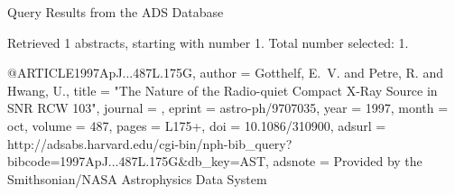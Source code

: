 Query Results from the ADS Database


Retrieved 1 abstracts, starting with number 1.  Total number selected: 1.

@ARTICLE{1997ApJ...487L.175G,
   author = {{Gotthelf}, E.~V. and {Petre}, R. and {Hwang}, U.},
    title = "{The Nature of the Radio-quiet Compact X-Ray Source in SNR RCW 103}",
  journal = {\apjl},
   eprint = {astro-ph/9707035},
     year = 1997,
    month = oct,
   volume = 487,
    pages = {L175+},
      doi = {10.1086/310900},
   adsurl = {http://adsabs.harvard.edu/cgi-bin/nph-bib_query?bibcode=1997ApJ...487L.175G&db_key=AST},
  adsnote = {Provided by the Smithsonian/NASA Astrophysics Data System}
}


